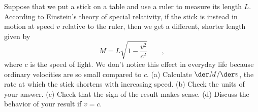 Suppose that we put a stick on a table and use a ruler
to measure its length $L$.
According to Einstein's theory of special relativity,
if the stick is instead in motion at speed $v$ relative to the ruler, then
we get a different, shorter length given by
\begin{equation*}
  M = L\sqrt{1-\frac{v^2}{c^2}} \qquad ,
\end{equation*}
where $c$ is the speed of light. We don't notice this effect in
everyday life because ordinary velocities are so small compared
to $c$.
(a) Calculate $\der M/\der v$, the rate at which the stick shortens
with increasing speed. (b) Check the units of your answer.
(c) Check that the sign of the result makes sense.
(d) Discuss the behavior of your result if $v=c$.\answercheck
